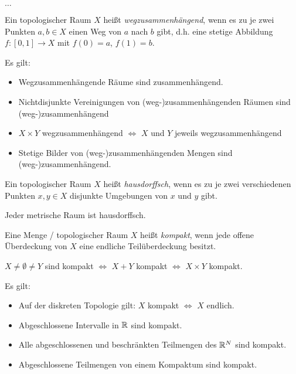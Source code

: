 ﻿$\dots$

\begin{defi}[Wegzusammenhang]
Ein topologischer Raum $X$ heißt \emph{wegzusammenhängend}, wenn es zu je zwei Punkten $a, b \in X$ einen Weg von $a$ nach $b$ gibt, d.h. eine stetige Abbildung $f: [0, 1] \to X$ mit $f(0) = a$, $f(1) = b$.
\end{defi}

\begin{bem} Es gilt:
\begin{itemize}
\item Wegzusammenhängende Räume sind zusammenhängend.
\item Nichtdisjunkte Vereinigungen von (weg-)zusammenhängenden Räumen sind (weg-)zusammenhängend
\item $X \times Y$ wegzusammenhängend $\Leftrightarrow$ $X$ und $Y$ jeweils wegzusammenhängend
\item Stetige Bilder von (weg-)zusammenhängenden Mengen sind (weg-)zusammenhängend. \\
\end{itemize}
\end{bem}


\begin{defi}[Hausdorffsch]
Ein topologischer Raum $X$ heißt \emph{hausdorffsch}, wenn es zu je zwei verschiedenen Punkten $x, y \in X$ disjunkte Umgebungen von $x$ und $y$ gibt.
\end{defi}

\begin{bem} Jeder metrische Raum ist hausdorffsch. \\
\end{bem}

\begin{defi}[Kompaktheit]
Eine Menge / topologischer Raum $X$ heißt \emph{kompakt}, wenn jede offene Überdeckung von $X$ eine endliche Teilüberdeckung besitzt.
\end{defi}

\begin{bem} $X \neq \emptyset \neq Y$ sind kompakt $\Leftrightarrow$ $X + Y$ kompakt $\Leftrightarrow$ $X \times Y$ kompakt.
\end{bem}

\begin{bsp} Es gilt:
\begin{itemize}
\item Auf der diskreten Topologie gilt: $X$ kompakt $\Leftrightarrow$ $X$ endlich.
\item Abgeschlossene Intervalle in $\mathbb R$ sind kompakt.
\item Alle abgeschlossenen und beschränkten Teilmengen des $\mathbb R^N$ sind kompakt.
\item Abgeschlossene Teilmengen von einem Kompaktum sind kompakt.
\end{itemize}
\end{bsp}

